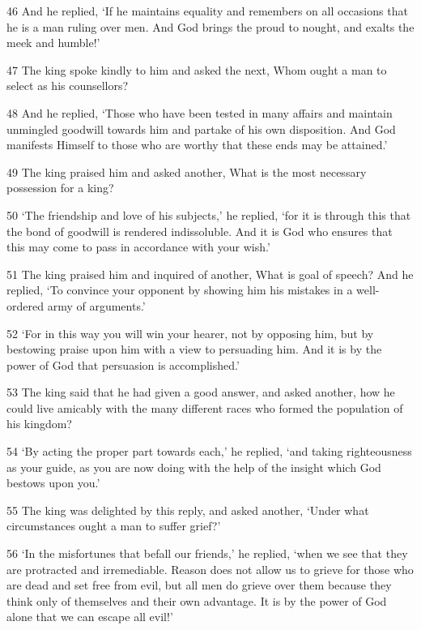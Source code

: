 \par 46 And he replied, ‘If he maintains equality and remembers on all occasions that he is a man ruling over men. And God brings the proud to nought, and exalts the meek and humble!’

\par 47 The king spoke kindly to him and asked the next, Whom ought a man to select as his counsellors?

\par 48 And he replied, ‘Those who have been tested in many affairs and maintain unmingled goodwill towards him and partake of his own disposition. And God manifests Himself to those who are worthy that these ends may be attained.’

\par 49 The king praised him and asked another, What is the most necessary possession for a king?

\par 50 ‘The friendship and love of his subjects,’ he replied, ‘for it is through this that the bond of goodwill is rendered indissoluble. And it is God who ensures that this may come to pass in accordance with your wish.’

\par 51 The king praised him and inquired of another, What is goal of speech? And he replied, ‘To convince your opponent by showing him his mistakes in a well-ordered army of arguments.’

\par 52 ‘For in this way you will win your hearer, not by opposing him, but by bestowing praise upon him with a view to persuading him. And it is by the power of God that persuasion is accomplished.’

\par 53 The king said that he had given a good answer, and asked another, how he could live amicably with the many different races who formed the population of his kingdom?

\par 54 ‘By acting the proper part towards each,’ he replied, ‘and taking righteousness as your guide, as you are now doing with the help of the insight which God bestows upon you.’

\par 55 The king was delighted by this reply, and asked another, ‘Under what circumstances ought a man to suffer grief?’

\par 56 ‘In the misfortunes that befall our friends,’ he replied, ‘when we see that they are protracted and irremediable. Reason does not allow us to grieve for those who are dead and set free from evil, but all men do grieve over them because they think only of themselves and their own advantage. It is by the power of God alone that we can escape all evil!’

